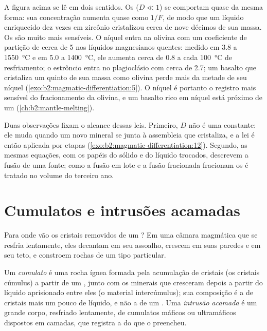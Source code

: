 A figura acima se lê em dois sentidos. Os  ($D \ll 1$) se comportam
quase da mesma forma: sua concentração aumenta quase como $1/F$, de modo que um líquido enriquecido
dez vezes em zircônio cristalizou cerca de nove décimos de sua massa. Os 
são muito mais sensíveis. O níquel entra na olivina com um coeficiente de partição
de cerca de 5 nos líquidos magnesianos quentes: medido em 3.8 a
\qty{1550}{\celsius} e em 5.0 a \qty{1400}{\celsius}, ele aumenta cerca de 0.8 a cada
\qty{100}{\celsius} de resfriamento; o estrôncio entra no
plagioclásio com cerca de 2.7; um basalto que cristaliza um quinto de sua massa como
olivina perde mais da metade de seu níquel (\cref{exo:b2:magmatic-differentiation:5}). O níquel é portanto o
registro mais sensível do fracionamento da olivina, e um basalto rico em níquel está
próximo de um  (\cref{ch:b2:mantle-melting}).

Duas observações fixam o alcance dessas leis. Primeiro, $D$ não é uma constante: ele muda
quando um novo mineral se junta à assembleia que cristaliza, e a lei é então aplicada
por etapas (\cref{exo:b2:magmatic-differentiation:12}). Segundo, as mesmas equações, com os papéis do sólido e do
líquido trocados, descrevem a fusão de uma fonte; como a fusão em lote e a fusão fracionada
fracionam os  é tratado no volume do terceiro ano.

\section{Cumulatos e intrusões acamadas}\label{sec:b2:magmatic-differentiation:cumulates}

Para onde vão os cristais removidos de um ? Em uma câmara magmática que se resfria
lentamente, eles decantam em seu assoalho, crescem em suas paredes e em seu teto, e constroem rochas de um
tipo particular.

\begin{definition}\label{def:b2:magmatic-differentiation:cumulate}
Um \emph{cumulato} é uma rocha ígnea formada pela acumulação de
cristais (os cristais cúmulus) a partir de um , junto com os minerais que cresceram depois
a partir do líquido aprisionado entre eles (o material intercúmulus); sua composição
é a de cristais mais um pouco de líquido, e não a de um . Uma \emph{intrusão
acamada} é um grande corpo, resfriado lentamente, de cumulatos máficos ou
ultramáficos dispostos em camadas, que registra a  do
 que o preencheu.
\end{definition}

